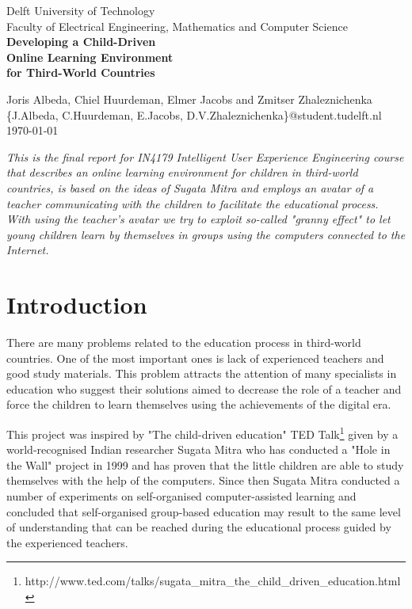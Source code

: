 \documentclass[a4paper]{article}
\begin{document}
\begin{titlepage}

\begin{center}

Delft University of Technology\\
Faculty of Electrical Engineering, Mathematics and Computer Science\\[3cm]
\huge \bf{Developing a Child-Driven \\ Online Learning Environment \\ for Third-World Countries}\\[15cm]
\end{center}

\large \noindent 
Joris Albeda, Chiel Huurdeman, Elmer Jacobs and Zmitser Zhaleznichenka\\
\{J.Albeda, C.Huurdeman, E.Jacobs, D.V.Zhaleznichenka\}@student.tudelft.nl\\

\noindent\today

\end{titlepage}

\setcounter{secnumdepth}{3}

\abstract \emph{This is the final report for IN4179 Intelligent User Experience Engineering course that describes an online learning environment for children in third-world countries, is based on the ideas of Sugata Mitra and employs an avatar of a teacher communicating with the children to facilitate the educational process. With using the teacher's avatar we try to exploit so-called "granny effect" to let young children learn by themselves in groups using the computers connected to the Internet.}

\section{Introduction}

There are many problems related to the education process in third-world countries. One of the most important ones is lack of experienced teachers and good study materials. This problem attracts the attention of many specialists in education who suggest their solutions aimed to decrease the role of a teacher and force the children to learn themselves using the achievements of the digital era.

This project was inspired by "The child-driven education" TED Talk\footnote{http://www.ted.com/talks/sugata\_mitra\_the\_child\_driven\_education.html} given by a world-recognised Indian researcher Sugata Mitra who has conducted a "Hole in the Wall" project in 1999 and has proven that the little children are able to study themselves with the help of the computers. Since then Sugata Mitra conducted a number of experiments on self-organised computer-assisted learning and concluded that self-organised group-based education may result to the same level of understanding that can be reached during the educational process guided by the experienced teachers. 
\end{document}
